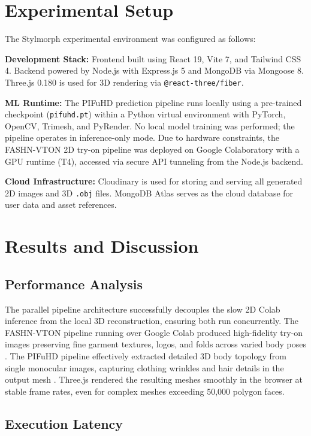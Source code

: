 \documentclass[conference]{IEEEtran}
\begin{document}
\section{Experimental Setup}

The Stylmorph experimental environment was configured as follows:

\textbf{Development Stack:} Frontend built using React 19, Vite 7, and Tailwind CSS 4. Backend powered by Node.js with Express.js 5 and MongoDB via Mongoose 8. Three.js 0.180 is used for 3D rendering via \texttt{@react-three/fiber}.

\textbf{ML Runtime:} The PIFuHD prediction pipeline runs locally using a pre-trained checkpoint (\texttt{pifuhd.pt}) within a Python virtual environment with PyTorch, OpenCV, Trimesh, and PyRender. No local model training was performed; the pipeline operates in inference-only mode. Due to hardware constraints, the FASHN-VTON 2D try-on pipeline was deployed on Google Colaboratory with a GPU runtime (T4), accessed via secure API tunneling from the Node.js backend.

\textbf{Cloud Infrastructure:} Cloudinary is used for storing and serving all generated 2D images and 3D \texttt{.obj} files. MongoDB Atlas serves as the cloud database for user data and asset references.

\section{Results and Discussion}

\subsection{Performance Analysis}

The parallel pipeline architecture successfully decouples the slow 2D Colab inference from the local 3D reconstruction, ensuring both run concurrently. The FASHN-VTON pipeline running over Google Colab produced high-fidelity try-on images preserving fine garment textures, logos, and folds across varied body poses \cite{b23}. The PIFuHD pipeline effectively extracted detailed 3D body topology from single monocular images, capturing clothing wrinkles and hair details in the output mesh \cite{b5}. Three.js rendered the resulting meshes smoothly in the browser at stable frame rates, even for complex meshes exceeding 50,000 polygon faces.

\subsection{Execution Latency}
\end{document}
